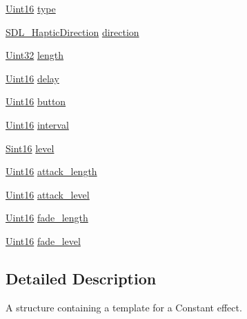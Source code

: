 \begin{DoxyCompactItemize}
\item 
\hyperlink{_s_d_l__stdinc_8h_a31fcc0a076c9068668173ee26d33e42b}{Uint16} \hyperlink{struct_s_d_l___haptic_constant_a5cb31202803a8bc1be95fcede5ac8afb}{type}
\item 
\hyperlink{struct_s_d_l___haptic_direction}{S\+D\+L\+\_\+\+Haptic\+Direction} \hyperlink{struct_s_d_l___haptic_constant_a3e871debf4e57c35960f019d2605d84f}{direction}
\item 
\hyperlink{_s_d_l__stdinc_8h_add440eff171ea5f55cb00c4a9ab8672d}{Uint32} \hyperlink{struct_s_d_l___haptic_constant_aeb994c356b1d236b060f277d157e98ec}{length}
\item 
\hyperlink{_s_d_l__stdinc_8h_a31fcc0a076c9068668173ee26d33e42b}{Uint16} \hyperlink{struct_s_d_l___haptic_constant_a16a751009893f5412201e3ce91146b25}{delay}
\item 
\hyperlink{_s_d_l__stdinc_8h_a31fcc0a076c9068668173ee26d33e42b}{Uint16} \hyperlink{struct_s_d_l___haptic_constant_aa65321f1b002adaab6e629d5bed556e9}{button}
\item 
\hyperlink{_s_d_l__stdinc_8h_a31fcc0a076c9068668173ee26d33e42b}{Uint16} \hyperlink{struct_s_d_l___haptic_constant_ab1f7f0df856f4cf1fdf937cb886226b4}{interval}
\item 
\hyperlink{_s_d_l__stdinc_8h_a9d0257032c0e146ab6121bf0122712f5}{Sint16} \hyperlink{struct_s_d_l___haptic_constant_a5b095eea77464623ed57af15f29f4ca6}{level}
\item 
\hyperlink{_s_d_l__stdinc_8h_a31fcc0a076c9068668173ee26d33e42b}{Uint16} \hyperlink{struct_s_d_l___haptic_constant_a907bade68ab53fb24e7d2651d19b767f}{attack\+\_\+length}
\item 
\hyperlink{_s_d_l__stdinc_8h_a31fcc0a076c9068668173ee26d33e42b}{Uint16} \hyperlink{struct_s_d_l___haptic_constant_a0928a37f3fab0e5b7daffc7a1d65744c}{attack\+\_\+level}
\item 
\hyperlink{_s_d_l__stdinc_8h_a31fcc0a076c9068668173ee26d33e42b}{Uint16} \hyperlink{struct_s_d_l___haptic_constant_a647a6b761ac6ba16160d0892a12806bc}{fade\+\_\+length}
\item 
\hyperlink{_s_d_l__stdinc_8h_a31fcc0a076c9068668173ee26d33e42b}{Uint16} \hyperlink{struct_s_d_l___haptic_constant_a49f6499c89f3e494efbe92f12277c949}{fade\+\_\+level}
\end{DoxyCompactItemize}


\subsection{Detailed Description}
A structure containing a template for a Constant effect. 

